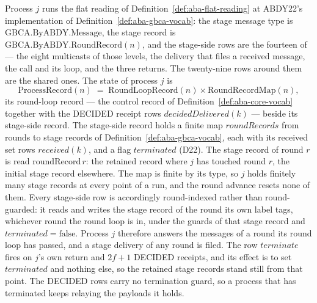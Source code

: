 \begin{definition}
  \label{def:aba-procnet}
  \leanok
  Process $j$ runs the flat reading of Definition~\ref{def:aba-flat-reading} at ABDY22's implementation of Definition~\ref{def:aba-gbca-vocab}: the stage message type is $\mathrm{GBCA.ByABDY.Message}$, the stage record is $\mathrm{GBCA.ByABDY.RoundRecord}(n)$, and the stage-side rows are the fourteen of  --- the eight multicasts of those levels, the delivery that files a received message, the call and its loop, and the three returns.
  The twenty-nine rows around them are the shared ones.
  The state of process $j$ is
  \[
    \mathrm{ProcessRecord}(n) \;=\;
      \mathrm{RoundLoopRecord}(n) \times \mathrm{RoundRecordMap}(n),
  \]
  its round-loop record --- the control record of Definition~\ref{def:aba-core-vocab} together with the DECIDED receipt rows $decidedDelivered(k)$ --- beside its stage-side record.
  The stage-side record holds a finite map $roundRecords$ from rounds to stage records of Definition~\ref{def:aba-gbca-vocab}, each with its received set rows $received(k)$, and a flag $terminated$ (D22).
  The stage record of round $r$ is read $\mathrm{roundRecord}\,r$: the retained record where $j$ has touched round $r$, the initial stage record elsewhere.
  The map is finite by its type, so $j$ holds finitely many stage records at every point of a run, and the round advance resets none of them.
  Every stage-side row is accordingly round-indexed rather than round-guarded: it reads and writes the stage record of the round its own label tags, whichever round the round loop is in, under the guards of that stage record and $terminated = \mathrm{false}$.
  Process $j$ therefore answers the messages of a round its round loop has passed, and a stage delivery of any round is filed.
  The row $terminate$ fires on $j$'s own return and $2f+1$ DECIDED receipts, and its effect is to set $terminated$ and nothing else, so the retained stage records stand still from that point.
  The DECIDED rows carry no termination guard, so a process that has terminated keeps relaying the payloads it holds.

\end{definition}
